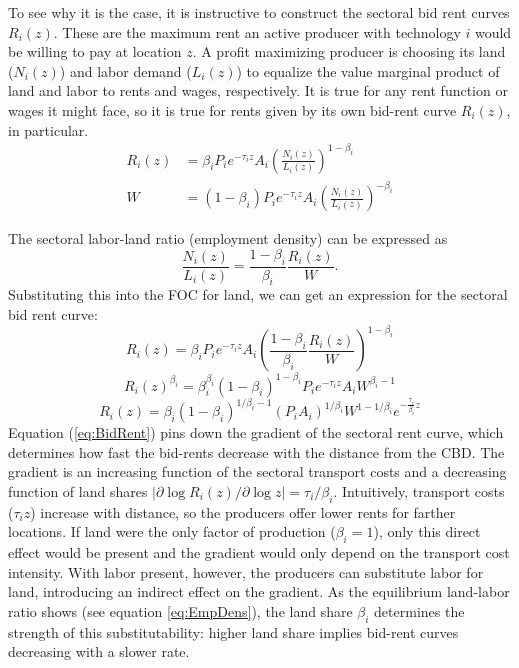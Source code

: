 \documentclass[12pt]{article}
\begin{document}
To see why it is the case, it is instructive to construct the sectoral bid rent curves $R_i(z)$. These are the maximum rent an active producer with technology $i$ would be willing to pay at location $z$. %
A profit maximizing producer is choosing its land ($N_i(z)$) and labor demand ($L_i(z)$) to equalize the value marginal product of land and labor to rents and wages, respectively. It is true for any rent function or wages it might face, so it is true for rents given by its own bid-rent curve $R_i(z)$, in particular.
\begin{align}
R_i(z) &=\beta_i P_ie^{-\tau_i z}A_i \left(\frac{N_i(z)}{L_i(z)}\right)^{1-\beta_i}\\
W &=(1-\beta_i) P_ie^{-\tau_i z}A_i \left(\frac{N_i(z)}{L_i(z)}\right)^{-\beta_i}
\end{align}

The sectoral labor-land ratio (employment density) can be expressed as
\begin{equation}
\label{eq:EmpDens}
\frac{N_i(z)}{L_i(z)} = \frac{1-\beta_i}{\beta_i}\frac{R_i(z)}{W}.
\end{equation}
Substituting this into the FOC for land, we can get an expression for the sectoral bid rent curve:
\[
R_i(z) =\beta_i P_ie^{-\tau_i z}A_i \left(\frac{1-\beta_i}{\beta_i}\frac{R_i(z)}{W}\right)^{1-\beta_i}
\]
\[
R_i(z)^{\beta_i} =\beta_i^{\beta_i}(1-\beta_i)^{1-\beta_i} P_ie^{-\tau_i z}A_i W^{\beta_i-1}
\]
\begin{equation}
\label{eq:BidRent}
R_i(z) =\beta_i(1-\beta_i)^{1/\beta_i-1} (P_iA_i)^{1/\beta_i} W^{1-1/\beta_i} e^{-\frac{\tau_i}{\beta_i} z}
\end{equation}
Equation (\ref{eq:BidRent}) pins down the gradient of the sectoral rent curve, which determines how fast the bid-rents decrease with the distance from the CBD. The gradient is an increasing function of the sectoral transport costs and a decreasing function of land shares $|\partial\log R_i(z)/\partial \log z|=\tau_i/\beta_i$. Intuitively, transport costs ($\tau_iz$) increase with distance, so the producers offer lower rents for farther locations. If land were the only factor of production ($\beta_i=1$), only this direct effect would be present and the gradient would only depend on the transport cost intensity. With labor present, however, the producers can substitute labor for land, introducing an indirect effect on the gradient. As the equilibrium land-labor ratio shows (see equation \ref{eq:EmpDens}), the land share $\beta_i$ determines the strength of this substitutability: higher land share implies bid-rent curves decreasing with a slower rate.
\end{document}
